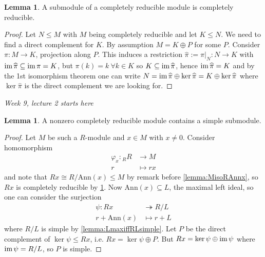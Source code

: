 \documentclass[a4paper]{article}
\newcommand{\Ann}{\text{Ann}}
\newcommand{\im}{\text{im\,}}
\theoremstyle{definition}
\newtheorem{lemma}[defn]{Lemma}
\begin{document}
\begin{lemma}
\label{lemma:subofcrmodiscr}
A submodule of a completely reducible module is completely reducible.
\end{lemma}
\begin{proof}
Let $N\leq M$ with $M$ being completely reducible and let $K\leq N$. We need to find a direct complement for $K$. By assumption $M=K\oplus P$ for some $P$. Consider $\pi:M\rightarrow K$, projection along $P$. This induces a restriction $\widehat\pi:=\pi|_N:N\rightarrow K$ with $\im \widehat\pi\subseteq \im\pi= K$, but $\pi(k)=k \ \forall k\in K$ so $K\subseteq\im\widehat\pi$, hence $\im\widehat\pi=K$ and by the 1st isomorphism theorem one can write $N=\im\widehat\pi\oplus\ker\widehat\pi=K\oplus\ker\widehat\pi$ where $\ker\widehat\pi$ is the direct complement we are looking for.
\end{proof}

\begin{flushright}
\textit{Week 9, lecture 2 starts here}
\end{flushright}

\begin{lemma}
\label{lemma:crmodhassimpsub}
A nonzero completely reducible module contains a simple submodule.
\end{lemma}
\begin{proof}
Let $M$ be such a $R$-module and $x\in M$ with $x\neq 0$. Consider homomorphism
\[
\begin{aligned}
\varphi_x:{}_RR&\rightarrow M\\
r&\mapsto rx
\end{aligned}
\]
and note that $Rx\cong R/\Ann(x)\leq M$ by remark before \ref{lemma:MisoRAnnx}, so $Rx$ is completely reducible by \ref{lemma:subofcrmodiscr}. Now $\Ann(x)\subseteq L$, the maximal left ideal, so one can consider the surjection
\[
\begin{aligned}
\psi:Rx&\twoheadrightarrow R/L\\
r+\Ann(x)&\mapsto r+L
\end{aligned}
\]
where $R/L$ is simple by \ref{lemma:LmaxiffRLsimple}. Let $P$ be the direct complement of $\ker\psi\leq Rx$, i.e. $Rx=\ker\psi\oplus P$. But $Rx=\ker\psi\oplus\im\psi$ where $\im\psi=R/L$, so $P$ is simple. 
\end{proof}
\end{document}
